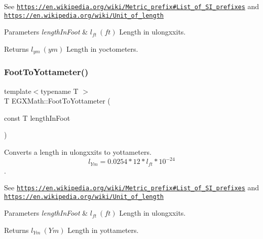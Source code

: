 See \href{https://en.wikipedia.org/wiki/Metric_prefix#List_of_SI_prefixes}{\tt https\+://en.\+wikipedia.\+org/wiki/\+Metric\+\_\+prefix\#\+List\+\_\+of\+\_\+\+S\+I\+\_\+prefixes} and \href{https://en.wikipedia.org/wiki/Unit_of_length}{\tt https\+://en.\+wikipedia.\+org/wiki/\+Unit\+\_\+of\+\_\+length} 
\begin{DoxyParams}{Parameters}
{\em length\+In\+Foot} & $ l_{ft}\ (ft)$ Length in ulongxxits. \\
\hline
\end{DoxyParams}
\begin{DoxyReturn}{Returns}
$ l_{ym}\ (ym)$ Length in yoctometers. 
\end{DoxyReturn}
\mbox{\label{group___e_g_x_math-_conversions-_length_conversions-_imperial-_foot-_s_i_ga46034464c113e5d1689c0fd573c65977}} 
\subsubsection{\texorpdfstring{Foot\+To\+Yottameter()}{FootToYottameter()}}
{\footnotesize\ttfamily template$<$typename T $>$ \\
T E\+G\+X\+Math\+::\+Foot\+To\+Yottameter (\begin{DoxyParamCaption}\item[{const T}]{length\+In\+Foot }\end{DoxyParamCaption})}



Converts a length in ulongxxits to yottameters. \[ l_{Ym}=0.0254 * 12 * l_{ft} * 10^{-24} \]. 

See \href{https://en.wikipedia.org/wiki/Metric_prefix#List_of_SI_prefixes}{\tt https\+://en.\+wikipedia.\+org/wiki/\+Metric\+\_\+prefix\#\+List\+\_\+of\+\_\+\+S\+I\+\_\+prefixes} and \href{https://en.wikipedia.org/wiki/Unit_of_length}{\tt https\+://en.\+wikipedia.\+org/wiki/\+Unit\+\_\+of\+\_\+length} 
\begin{DoxyParams}{Parameters}
{\em length\+In\+Foot} & $ l_{ft}\ (ft)$ Length in ulongxxits. \\
\hline
\end{DoxyParams}
\begin{DoxyReturn}{Returns}
$ l_{Ym}\ (Ym)$ Length in yottameters. 
\end{DoxyReturn}
\mbox{\label{group___e_g_x_math-_conversions-_length_conversions-_imperial-_foot-_s_i_ga6418a94f8c9855745fc9eb05c6aa121e}} 
